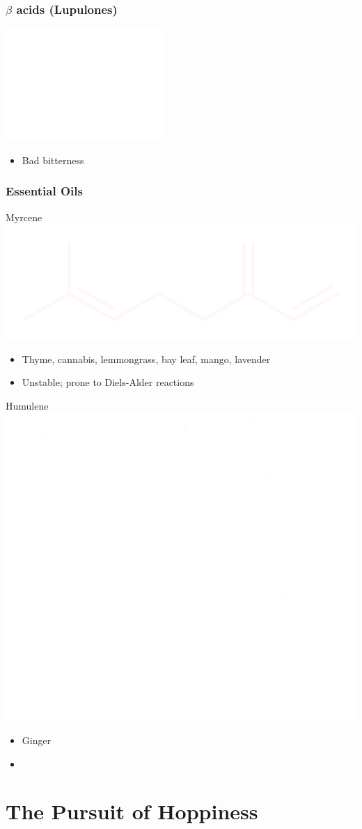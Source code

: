 \documentclass{beamer}
\begin{document}
\begin{frame}\frametitle{$\beta$ acids (Lupulones)}
  \includegraphics[width=.5\textwidth]{./brewing/hops/Lupulone-dark.pdf}
  \begin{itemize}
    \item Bad bitterness
  \end{itemize}
\end{frame}

\begin{frame}\frametitle{Essential Oils}
  Myrcene \includegraphics[width=.25\textwidth]{./brewing/hops/Myrcene-dark.pdf}
  \begin{itemize}
  \item Thyme, cannabis, lemmongrass, bay leaf, mango, lavender
  \item Unstable; prone to Diels-Alder reactions
  \end{itemize}
  Humulene \includegraphics[width=.15\textwidth]{./brewing/hops/Humulene-dark.pdf}
  \begin{itemize}
  \item Ginger
  \item
  \end{itemize}
\end{frame}





\section{The Pursuit of Hoppiness}
\end{document}
